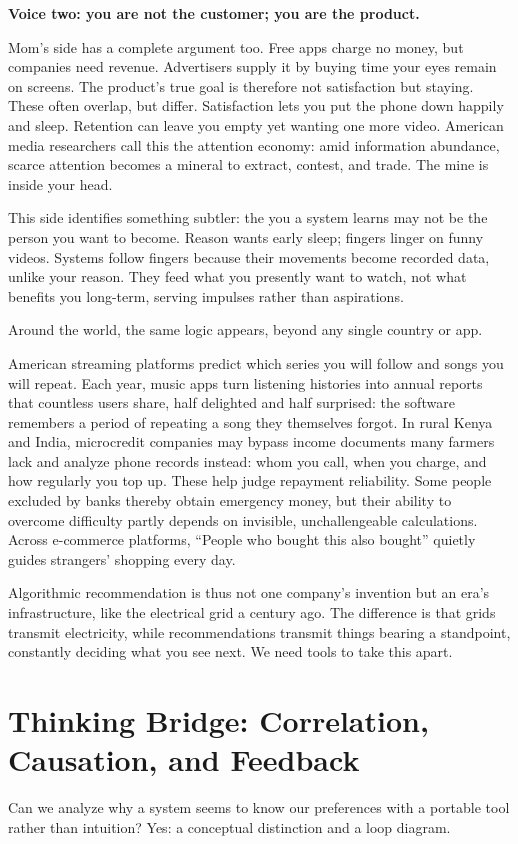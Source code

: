 \textbf{Voice two: you are not the customer; you are the product.}

Mom's side has a complete argument too. Free apps charge no money, but companies need revenue. Advertisers supply it by buying time your eyes remain on screens. The product's true goal is therefore not satisfaction but staying. These often overlap, but differ. Satisfaction lets you put the phone down happily and sleep. Retention can leave you empty yet wanting one more video. American media researchers call this the attention economy: amid information abundance, scarce attention becomes a mineral to extract, contest, and trade. The mine is inside your head.

This side identifies something subtler: the you a system learns may not be the person you want to become. Reason wants early sleep; fingers linger on funny videos. Systems follow fingers because their movements become recorded data, unlike your reason. They feed what you presently want to watch, not what benefits you long-term, serving impulses rather than aspirations.

Around the world, the same logic appears, beyond any single country or app.

American streaming platforms predict which series you will follow and songs you will repeat. Each year, music apps turn listening histories into annual reports that countless users share, half delighted and half surprised: the software remembers a period of repeating a song they themselves forgot. In rural Kenya and India, microcredit companies may bypass income documents many farmers lack and analyze phone records instead: whom you call, when you charge, and how regularly you top up. These help judge repayment reliability. Some people excluded by banks thereby obtain emergency money, but their ability to overcome difficulty partly depends on invisible, unchallengeable calculations. Across e-commerce platforms, ``People who bought this also bought'' quietly guides strangers' shopping every day.

Algorithmic recommendation is thus not one company's invention but an era's infrastructure, like the electrical grid a century ago. The difference is that grids transmit electricity, while recommendations transmit things bearing a standpoint, constantly deciding what you see next. We need tools to take this apart.

\section[Correlation, Causation, and Feedback]{Thinking Bridge: Correlation, Causation, and Feedback}
Can we analyze why a system seems to know our preferences with a portable tool rather than intuition? Yes: a conceptual distinction and a loop diagram.

